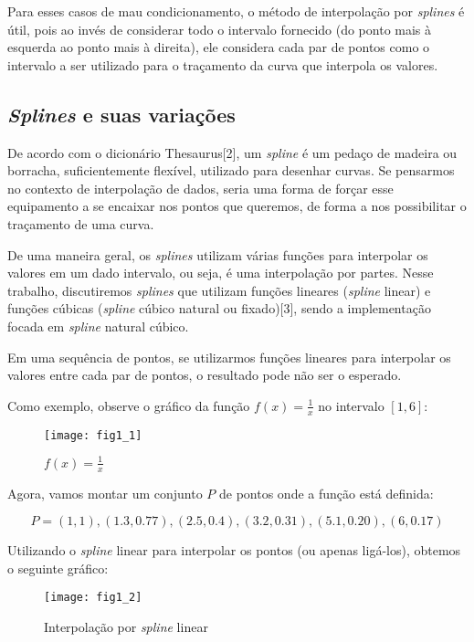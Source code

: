 \documentclass[11pt]{article}
\begin{document}
Para esses casos de mau condicionamento, o método de interpolação
por \textit{splines} é útil, pois ao invés de considerar todo
o intervalo fornecido (do ponto mais à esquerda ao ponto mais à direita),
ele considera cada par de pontos como o intervalo a ser utilizado para o traçamento
da curva que interpola os valores.

\subsection{\textit{Splines} e suas variações}

De acordo com o dicionário Thesaurus[2], um \textit{spline} é um
pedaço de madeira ou borracha, suficientemente flexível, utilizado
para desenhar curvas. Se pensarmos no contexto de interpolação de
dados, seria uma forma de forçar esse equipamento a se encaixar nos
pontos que queremos, de forma a nos possibilitar o traçamento de uma
curva.

De uma maneira geral, os \textit{splines} utilizam várias
funções para interpolar os valores em um dado intervalo, ou seja,
é uma interpolação por partes. Nesse trabalho, discutiremos \textit{splines}
que utilizam funções lineares (\textit{spline} linear) e funções cúbicas
(\textit{spline} cúbico natural ou fixado)[3], sendo a implementação focada
em \textit{spline} natural cúbico.

Em uma sequência de pontos, se utilizarmos funções lineares para interpolar
os valores entre cada par de pontos, o resultado pode não ser o
esperado.

Como exemplo, observe o gráfico da função $f(x) = \frac{1}{x}$ no intervalo
$[1, 6]$:

\begin{figure}[h]
\caption{$f(x) = \frac{1}{x}$}
\texttt{[image: fig1\_1]}
\centering
\end{figure}

Agora, vamos montar um conjunto $P$ de pontos onde a função está definida:

$$P = {(1, 1), (1.3, 0.77), (2.5, 0.4), (3.2, 0.31), (5.1, 0.20), (6, 0.17)}$$

Utilizando o \textit{spline} linear para interpolar os pontos (ou apenas
ligá-los), obtemos o seguinte gráfico:

\begin{figure}[h]
\caption{Interpolação por \textit{spline} linear}
\texttt{[image: fig1\_2]}
\centering
\end{figure}
\end{document}
